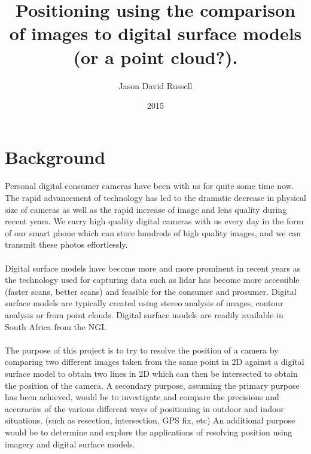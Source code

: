 \documentclass{article}
\title{Positioning using the comparison of images to digital surface models (or a point cloud?).}
\date{2015}
\author{Jason David Russell}
\begin{document}
\maketitle
{}

\newpage
\tableofcontents

\newpage
{}

\section{Background}
\paragraph{}
Personal digital consumer cameras have been with us for quite some time now. The rapid advancement of technology has led to the dramatic decrease in physical size of cameras as well as the rapid increase of image and lens quality during recent years. We carry high quality digital cameras with us every day in the form of our smart phone which can store hundreds of high quality images, and we can transmit these photos effortlessly.

\paragraph{}
Digital surface models have become more and more prominent in recent years as the technology used for capturing data such as lidar has become more accessible (faster scans, better scans) and feasible for the consumer and prosumer. Digital surface models are typically created using stereo analysis of images, contour analysis or from point clouds. Digital surface models are readily available in South Africa from the NGI.

\paragraph{}
The purpose of this project is to try to resolve the position of a camera by comparing two different images taken from the same point in 2D against a digital surface model to obtain two lines in 2D which can then be intersected to obtain the position of the camera. A secondary purpose, assuming the primary purpose has been achieved, would be to investigate and compare the precisions and accuracies of the various different ways of positioning in outdoor and indoor situations. (such as resection, intersection, GPS fix, etc) An additional purpose would be to determine and explore the applications of resolving position using imagery and digital surface models.
\end{document}
